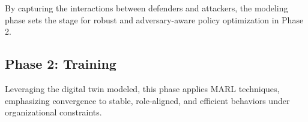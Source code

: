 \documentclass[conference]{IEEEtran}
\begin{document}
By capturing the interactions between defenders and attackers, the modeling phase sets the stage for robust and adversary-aware policy optimization in Phase 2.


\subsection{Phase 2: Training}


Leveraging the digital twin modeled, this phase applies MARL techniques, emphasizing convergence to stable, role-aligned, and efficient behaviors under organizational constraints.
\end{document}
